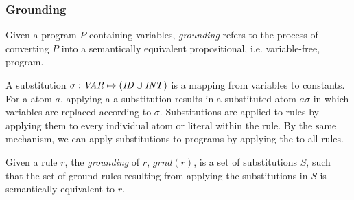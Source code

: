 \subsubsection{Grounding}
\label{subsubsec:prelims-grounding}
Given a program $P$ containing variables, \emph{grounding} refers to the process of converting $P$ into a semantically equivalent propositional, i.e. variable-free, program.

\begin{definition}
\label{def:prelims-asp-semantics-substitution}
A substitution $\sigma: \mathit{VAR} \mapsto (\mathit{ID} \cup \mathit{INT})$ is a mapping from variables to constants. For a atom $a$, applying a a substitution results in a substituted atom $a\sigma$ in which variables are replaced according to $\sigma$. Substitutions are applied to rules  by applying them to every individual atom or literal within the rule. By the same mechanism, we can apply substitutions to programs by applying the to all rules.
\end{definition}

\begin{definition}[Grounding]
\label{def:prelims-asp-semantics-grounding}
Given a rule $r$, the \emph{grounding} of $r$, $\mathit{grnd}(r)$, is a set of substitutions $S$, such that the set of ground rules resulting from applying the substitutions in $S$ is semantically equivalent to $r$.
\end{definition}